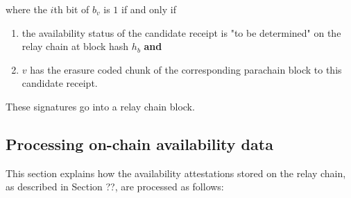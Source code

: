 where the $i$th bit of $b_v$ is $1$ if and only if

\begin{enumerate}
\item the availability status of the candidate receipt is "to be determined" on
the relay chain at block hash $h_b$ \textbf{and}

\item $v$ has the erasure coded chunk of the corresponding parachain block to
this candidate receipt.
\end{enumerate}

These signatures go into a relay chain block.

\subsection{Processing on-chain availability data}
This section explains how the availability attestations stored on the relay
chain, as described in Section ??, are processed as follows:

